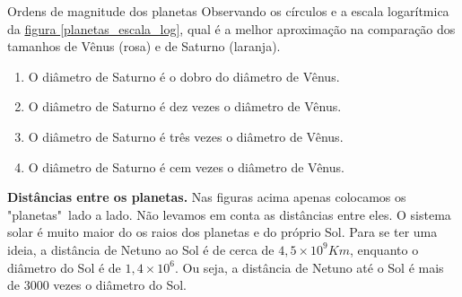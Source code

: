 \begin{task}{Ordens de magnitude dos planetas}
Observando os círculos e a escala logarítmica da \hyperref[planetas_escala_log]{figura \ref{planetas_escala_log}}, qual é a melhor aproximação na comparação dos tamanhos de Vênus (rosa) e de Saturno (laranja).
\begin{enumerate}
\item O diâmetro de Saturno é o dobro do diâmetro de Vênus.
\item O diâmetro de Saturno é dez vezes o diâmetro de Vênus.
\item O diâmetro de Saturno é três vezes o diâmetro de Vênus.
\item O diâmetro de Saturno é cem vezes o diâmetro de Vênus.
\end{enumerate}
\end{task}


\begin{knowledge}
\textbf{Distâncias entre os planetas.}
Nas figuras acima apenas colocamos os "planetas"\, lado a lado. Não levamos em conta as distâncias entre eles. O sistema solar é muito maior do os raios  dos planetas e do próprio Sol. Para se ter uma ideia, a distância de Netuno ao Sol é de cerca de $4{,}5 \times 10^{9}Km$, enquanto o diâmetro do Sol é de $1{,}4 \times 10^6$. Ou seja, a distância de Netuno até o Sol é mais de 3000 vezes o diâmetro do Sol.
\end{knowledge}


